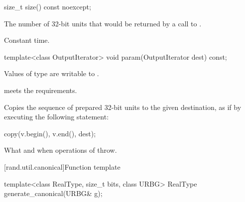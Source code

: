 %
\begin{itemdecl}
size_t size() const noexcept;
\end{itemdecl}

\begin{itemdescr}
\pnum
\returns
The number of 32-bit units
 that would be returned
 by a call to .

\pnum
\complexity
Constant time.
\end{itemdescr}

%
\begin{itemdecl}
template<class OutputIterator>
  void param(OutputIterator dest) const;
\end{itemdecl}

\begin{itemdescr}
\pnum
\mandates
  Values of type  are writable to .

\pnum
\expects
   meets the
   requirements.

\pnum
\effects
Copies the sequence of prepared 32-bit units
 to the given destination,
 as if by executing the following statement:
\begin{codeblock}
copy(v.begin(), v.end(), dest);
\end{codeblock}

\pnum
\throws
What and when  operations of  throw.
\end{itemdescr}


[rand.util.canonical]{Function template }%

%
\begin{itemdecl}
template<class RealType, size_t bits, class URBG>
  RealType generate_canonical(URBG& g);
\end{itemdecl}

